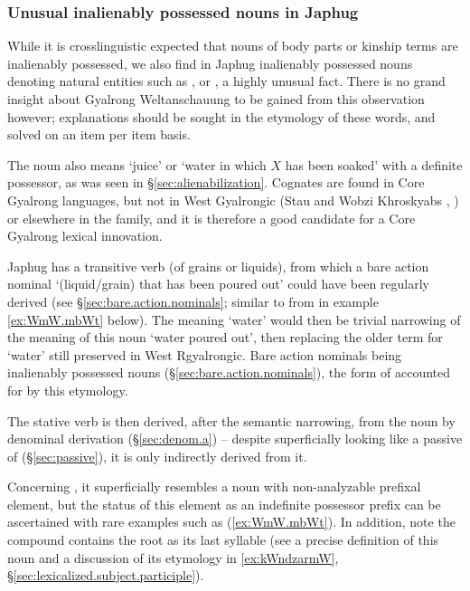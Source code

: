 \subsubsection{Unusual inalienably possessed nouns in Japhug} \label{sec:earth.IPN}
While it is crosslinguistic expected that nouns of body parts or kinship terms are inalienably possessed, we also find in Japhug inalienably possessed nouns denoting natural entities such as ,  or , a highly unusual fact. There is no grand insight about Gyalrong Weltanschauung to be gained from this observation however; explanations should be sought in the etymology of these words, and solved on an item per item basis.  

The noun  also means `juice' or `water in which $X$ has been soaked' with a definite possessor, as was seen in §\ref{sec:alienabilization}. Cognates are found in Core Gyalrong languages, but not in West Gyalrongic (Stau  and Wobzi Khroskyabs , \citealt[610]{jacques17stau}) or elsewhere in the family, and it is therefore a good candidate for a Core Gyalrong lexical innovation. 

Japhug has a transitive verb  (of grains or liquids), from which a bare action nominal  `(liquid/grain) that has been poured out' could have been regularly derived (see §\ref{sec:bare.action.nominals}; similar to  from  in example \ref{ex:WmW.mbWt} below). The meaning `water' would then be trivial narrowing of the meaning of this noun `water poured out', then replacing the older term for `water' still preserved in West Rgyalrongic. Bare action nominals being inalienably possessed nouns (§\ref{sec:bare.action.nominals}), the form of  accounted for by this etymology.

The stative verb  is then derived, after the semantic narrowing, from the noun  by denominal derivation (§\ref{sec:denom.a}) -- despite superficially looking like a passive of  (§\ref{sec:passive}), it is only indirectly derived from it.  

Concerning , it superficially resembles a noun with non-analyzable  prefixal element, but the status of this element as an indefinite possessor prefix can be ascertained with rare examples such as (\ref{ex:WmW.mbWt}). In addition, note the compound  contains the root  as its last syllable (see a precise definition of this noun and a discussion of its etymology in \ref{ex:kWndzarmW}, §\ref{sec:lexicalized.subject.participle}).

